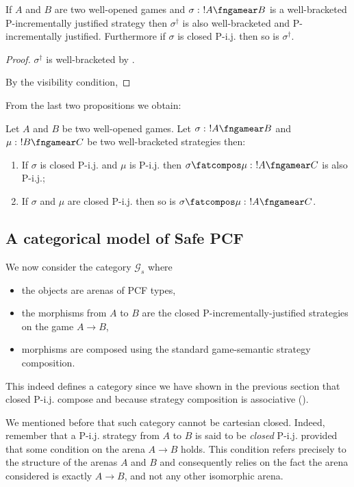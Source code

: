 \begin{proposition}
If $A$ and $B$ are two well-opened games and $\sigma :\ !A \fngamear
B$ is a well-bracketed P-incrementally justified strategy then
$\sigma^\dag$ is also well-bracketed and P-incrementally justified.
Furthermore if $\sigma$ is closed P-i.j. then so is
$\sigma^\dagger$.
\end{proposition}
\begin{proof}
$\sigma^\dag$ is well-bracketed by \cite[Proposition 2.10.]{abramsky94full}.

By the visibility condition,
\end{proof}

From the last two propositions we obtain:
\begin{corollary}
Let $A$ and $B$ be two well-opened games. Let
$\sigma :\ !A \fngamear B$ and $\mu :\ !B\fngamear C$ be two well-bracketed strategies then:
\begin{enumerate}
\item If $\sigma$ is closed P-i.j.
and $\mu$ is P-i.j. then $\sigma \fatcompos \mu :\ !A \fngamear C$ is also P-i.j.;
\item If $\sigma$ and $\mu$ are closed P-i.j. then so is $\sigma \fatcompos \mu :\ !A \fngamear C$.
\end{enumerate}
\end{corollary}

\subsection{A categorical model of Safe PCF}

We now consider the category $\mathcal{G}_s$ where
\begin{itemize}
\item the objects are arenas of PCF types,
\item the morphisms from $A$ to $B$ are the closed P-incrementally-justified strategies
on the game $A\rightarrow B$,
\item morphisms are composed using the standard game-semantic strategy composition.
\end{itemize}
This indeed defines a category since we have shown in the previous section
that closed P-i.j. compose and because strategy composition is associative (\cite{abramsky94full, hylandong_pcf}).

We mentioned before that such category cannot be cartesian closed. Indeed, remember that
a P-i.j. strategy from $A$ to $B$ is said to be \emph{closed} P-i.j. provided that some condition
on the arena $A\rightarrow B$ holds. This condition refers precisely to the structure of the arenas $A$ and $B$ and consequently relies on the fact the arena considered is exactly $A\rightarrow B$, and not any other isomorphic arena.




